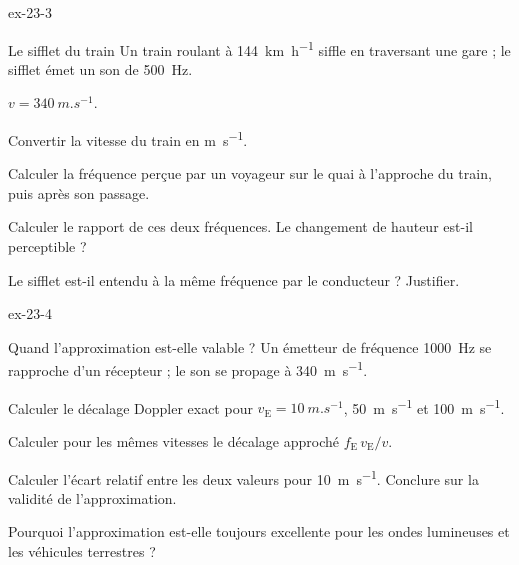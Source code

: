 \begin{blocLivre}{ex-23-3}
\begin{exercice}[1]{Le sifflet du train}
Un train roulant à \qty{144}{km.h^{-1}} siffle en traversant une gare ; le sifflet émet un son de \qty{500}{Hz}.
\begin{donnees}
$v=\qty{340}{m.s^{-1}}$.
\end{donnees}
\begin{questions}
\item Convertir la vitesse du train en \unit{m.s^{-1}}.
\item Calculer la fréquence perçue par un voyageur sur le quai à l'approche du train, puis après son passage.
\item Calculer le rapport de ces deux fréquences. Le changement de hauteur est-il perceptible ?
\item Le sifflet est-il entendu à la même fréquence par le conducteur ? Justifier.
\end{questions}
\end{exercice}
\end{blocLivre}
\begin{blocLivre}{ex-23-4}
\begin{exercice}[1]{Quand l'approximation est-elle valable ?}
Un émetteur de fréquence \qty{1000}{Hz} se rapproche d'un récepteur ; le son se propage à \qty{340}{m.s^{-1}}.
\begin{questions}
\item Calculer le décalage Doppler exact pour $v_\mathrm{E}=\qty{10}{m.s^{-1}}$, \qty{50}{m.s^{-1}} et \qty{100}{m.s^{-1}}.
\item Calculer pour les mêmes vitesses le décalage approché $f_\mathrm{E}\,v_\mathrm{E}/v$.
\item Calculer l'écart relatif entre les deux valeurs pour \qty{10}{m.s^{-1}}. Conclure sur la validité de l'approximation.
\item Pourquoi l'approximation est-elle toujours excellente pour les ondes lumineuses et les véhicules terrestres ?
\end{questions}
\end{exercice}
\end{blocLivre}
